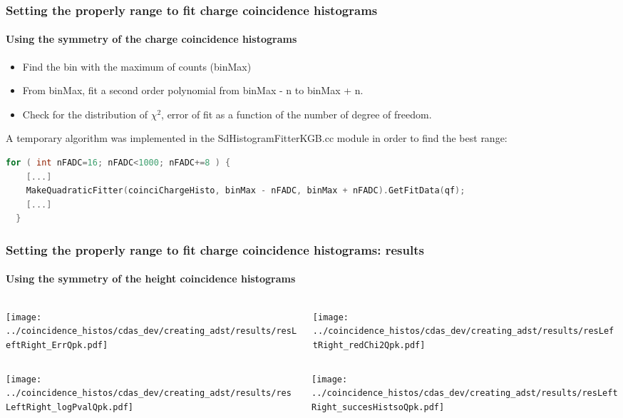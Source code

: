\documentclass[aspectratio=169]{beamer}
\begin{document}
\begin{frame}[fragile]
  \frametitle{Setting the properly range to fit charge
  coincidence histograms}
  \framesubtitle{Using the symmetry of the charge coincidence
  histograms}
  \vspace{0.5cm}

  \begin{itemize}
    \item Find the bin with the maximum of counts (binMax)           
    \item From binMax, fit a second order polynomial from binMax
      - n to binMax + n.
    \item Check for the distribution of $\chi^2$, error of fit
      as a function of the number of degree of freedom.
  \end{itemize}
  \vspace{.5cm}

  A temporary algorithm was implemented in the
  SdHistogramFitterKGB.cc module in order to find the best range:
  \begin{lstlisting}[language=C++, basicstyle = \ttfamily\tiny]
  for ( int nFADC=16; nFADC<1000; nFADC+=8 ) {
    [...]
    MakeQuadraticFitter(coinciChargeHisto, binMax - nFADC, binMax + nFADC).GetFitData(qf);
    [...]
  }
  \end{lstlisting}
\end{frame}


\begin{frame}
  \frametitle{Setting the properly range to fit charge
  coincidence histograms: results}
  \framesubtitle{Using the symmetry of the height coincidence
  histograms}
  \vspace{0.5cm}

  \begin{columns}
    \centering
    \begin{column}{0.5\textwidth}
      \texttt{[image: ../coincidence\_histos/cdas\_dev/creating\_adst/results/resLeftRight\_ErrQpk.pdf]}
    \end{column}
    \begin{column}{0.5\textwidth}
      \texttt{[image: ../coincidence\_histos/cdas\_dev/creating\_adst/results/resLeftRight\_redChi2Qpk.pdf]}
    \end{column}
  \end{columns}

  \begin{columns}
    \centering
    \begin{column}{0.5\textwidth}
      \texttt{[image: ../coincidence\_histos/cdas\_dev/creating\_adst/results/resLeftRight\_logPvalQpk.pdf]}
    \end{column}
    \begin{column}{0.5\textwidth}
      \texttt{[image: ../coincidence\_histos/cdas\_dev/creating\_adst/results/resLeftRight\_succesHistsoQpk.pdf]}
    \end{column}
  \end{columns}
\end{frame}
\end{document}
